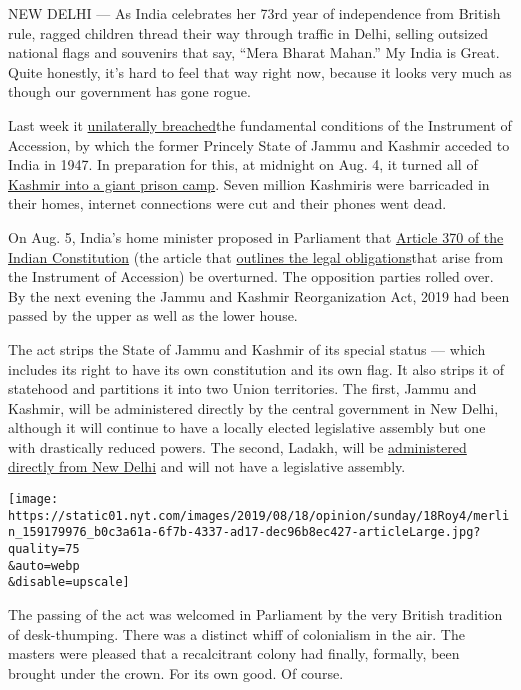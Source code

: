 NEW DELHI --- As India celebrates her 73rd year of independence from
British rule, ragged children thread their way through traffic in Delhi,
selling outsized national flags and souvenirs that say, ``Mera Bharat
Mahan.'' My India is Great. Quite honestly, it's hard to feel that way
right now, because it looks very much as though our government has gone
rogue.

Last week it
\href{https://www.nytimes.com/2019/08/08/opinion/modis-majoritarian-march-to-kashmir.html}{unilaterally
breached}the fundamental conditions of the Instrument of Accession, by
which the former Princely State of Jammu and Kashmir acceded to India in
1947. In preparation for this, at midnight on Aug. 4, it turned all of
\href{https://www.nytimes.com/2019/08/10/world/asia/kashmir-india-pakistan.html}{Kashmir
into a giant prison camp}. Seven million Kashmiris were barricaded in
their homes, internet connections were cut and their phones went dead.

On Aug. 5, India's home minister proposed in Parliament that
\href{https://www.nytimes.com/interactive/2019/world/asia/india-pakistan-crisis.html}{Article
370 of the Indian Constitution} (the article that
\href{https://thewire.in/law/murder-of-insaniyat-and-of-indias-solemn-commitment-to-kashmir}{outlines
the legal obligations}that arise from the Instrument of Accession) be
overturned. The opposition parties rolled over. By the next evening the
Jammu and Kashmir Reorganization Act, 2019 had been passed by the upper
as well as the lower house.

The act strips the State of Jammu and Kashmir of its special status ---
which includes its right to have its own constitution and its own flag.
It also strips it of statehood and partitions it into two Union
territories. The first, Jammu and Kashmir, will be administered directly
by the central government in New Delhi, although it will continue to
have a locally elected legislative assembly but one with drastically
reduced powers. The second, Ladakh, will be
\href{https://www.nytimes.com/2019/08/08/opinion/modis-majoritarian-march-to-kashmir.html}{administered
directly from New Delhi} and will not have a legislative assembly.

\texttt{[image: https://static01.nyt.com/images/2019/08/18/opinion/sunday/18Roy4/merlin\_159179976\_b0c3a61a-6f7b-4337-ad17-dec96b8ec427-articleLarge.jpg?quality=75\\\&auto=webp\\\&disable=upscale]}

The passing of the act was welcomed in Parliament by the very British
tradition of desk-thumping. There was a distinct whiff of colonialism in
the air. The masters were pleased that a recalcitrant colony had
finally, formally, been brought under the crown. For its own good. Of
course.

